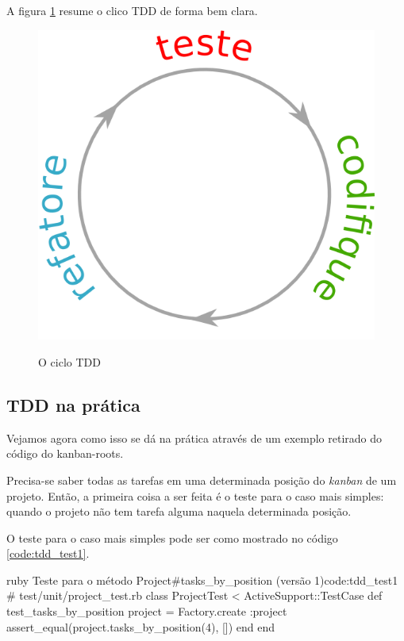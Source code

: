 A figura \ref{img:ciclo-tdd} resume o clico TDD de forma bem clara.

\begin{figure}[h]
  \center
  \caption{O ciclo TDD}
  \includegraphics[scale=0.45]{images/ciclo-tdd}
  \label{img:ciclo-tdd}
\end{figure}

\subsection{TDD na prática}
\label{ssub:tdd_na_pratica}

Vejamos agora como isso se dá na prática através de um exemplo retirado do código do kanban-roots.

Precisa-se saber todas as tarefas em uma determinada posição do \textit{kanban} de um projeto. Então, a primeira coisa a ser feita é o teste para o caso mais simples: quando o projeto não tem tarefa alguma naquela determinada posição.

O teste para o caso mais simples pode ser como mostrado no código \ref{code:tdd_test1}.

\begin{mycode}{ruby}%
{Teste para o método Project\#tasks\_by\_position (versão 1)}{code:tdd_test1}
# test/unit/project_test.rb
class ProjectTest < ActiveSupport::TestCase
  def test_tasks_by_position
    project = Factory.create :project
    assert_equal(project.tasks_by_position(4), [])
  end
end
\end{mycode}

